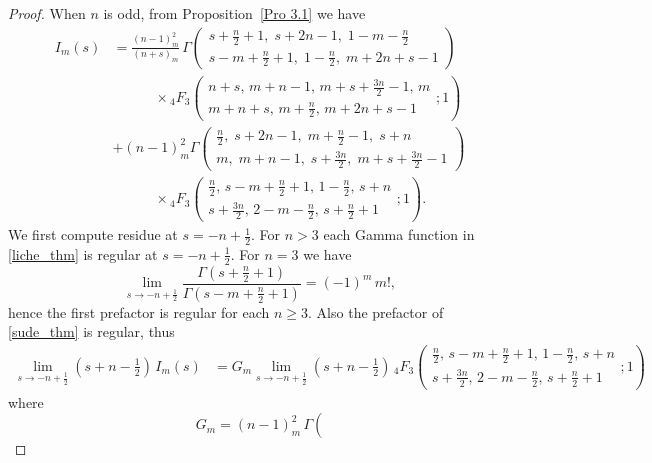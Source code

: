 \documentclass{article}
\theoremstyle{boldremark}
\renewcommand\[{\begin{equation}}
\renewcommand\]{\end{equation}}
\theoremstyle{definition}
\numberwithin{equation}{section}
\begin{document}
\begin{proof}
        When $n$ is odd, from Proposition~\ref{Pro 3.1} we have
\begin{align} 
I_m(s) &= \frac{(n-1)_m^2}{(n+s)_m}\,
\Gamma\!\left(
\begin{matrix}
s+\frac{n}{2}+1,\; s+2n-1,\; 1-m-\frac{n}{2}
\\
s-m+\frac{n}{2}+1,\; 1-\frac{n}{2},\; m+2n+s-1
\end{matrix}
\right) \label{liche_thm} \\[3pt]
&\qquad \quad \times {}_4F_3 \left( \begin{matrix} n + s, \, m + n - 1, \, m + s + \frac{3n}{2} - 1, \, m \\ m + n + s, \, m + \frac{n}{2}, \, m + 2n + s - 1 \end{matrix} ; 1 \right) \nonumber \\[1em]
& + (n-1)_m^2  \Gamma\!\left(
\begin{matrix}
\frac{n}{2},\; s+2n-1,\; m+\frac{n}{2}-1,\; s+n
\\
m,\; m+n-1,\; s+\frac{3n}{2},\; m+s+\frac{3n}{2}-1
\end{matrix}
\right) \label{sude_thm} \\[3pt]
&\qquad \quad \times {}_4F_3 \left( \begin{matrix} \frac{n}{2}, \, s - m + \frac{n}{2} + 1, \, 1 - \frac{n}{2}, \, s + n \\ s + \frac{3n}{2}, \, 2 - m - \frac{n}{2}, \, s + \frac{n}{2} + 1 \end{matrix} ; 1 \right) \nonumber.
\end{align}
We first compute residue at $s = -n+\frac1 2.$
For $n > 3$ each Gamma function in \eqref{liche_thm} is regular at $s = -n + \frac{1}{2}$. For $n = 3$ we have $$\lim_{s \rightarrow-n+\frac{1}{2}}\frac{\Gamma(s+\frac{n}{2}+1)}{\Gamma(s-m+\frac{n}{2}+1)} = (-1)^m\,m!,$$
hence the first prefactor is regular for each $n \geq 3$.
Also the prefactor of \eqref{sude_thm} is regular, thus 
\begin{align*}
   \lim_{s\rightarrow -n+\frac{1}{2}} (s+n-\frac{1}{2})\,I_m(s) &=  G_m \lim_{s\rightarrow -n+\frac{1}{2}} (s+n-\frac{1}{2})\,{}_4F_3 \left( \begin{matrix} \frac{n}{2}, \, s - m + \frac{n}{2} + 1, \, 1 - \frac{n}{2}, \, s + n \\ s + \frac{3n}{2}, \, 2 - m - \frac{n}{2}, \, s + \frac{n}{2} + 1 \end{matrix} ; 1 \right)
\end{align*}
where 
$$
G_m = (n-1)_m^2\,  \Gamma\!\left(
$$
\end{proof}
\end{document}
